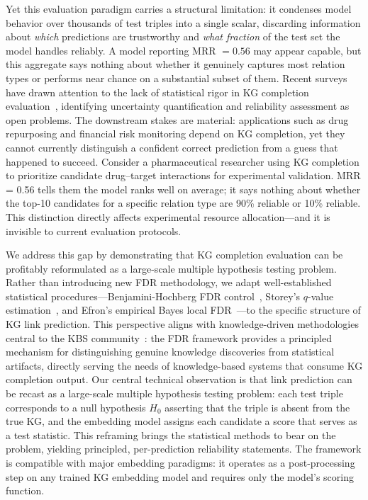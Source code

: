 Yet this evaluation paradigm carries a structural limitation: it condenses model behavior over thousands of test triples into a single scalar, discarding information about \emph{which} predictions are trustworthy and \emph{what fraction} of the test set the model handles reliably.
A model reporting MRR $= 0.56$ may appear capable, but this aggregate says nothing about whether it genuinely captures most relation types or performs near chance on a substantial subset of them.
Recent surveys have drawn attention to the lack of statistical rigor in KG completion evaluation~\cite{jarnac2025uncertainty,biswas2023knowledge}, identifying uncertainty quantification and reliability assessment as open problems.
The downstream stakes are material: applications such as drug repurposing and financial risk monitoring depend on KG completion, yet they cannot currently distinguish a confident correct prediction from a guess that happened to succeed.
Consider a pharmaceutical researcher using KG completion to prioritize candidate drug--target interactions for experimental validation. MRR = 0.56 tells them the model ranks well on average; it says nothing about whether the top-10 candidates for a specific relation type are 90\% reliable or 10\% reliable. This distinction directly affects experimental resource allocation---and it is invisible to current evaluation protocols.

We address this gap by demonstrating that KG completion evaluation can be profitably reformulated as a large-scale multiple hypothesis testing problem. Rather than introducing new FDR methodology, we adapt well-established statistical procedures---Benjamini-Hochberg FDR control~\cite{benjamini1995controlling}, Storey's $q$-value estimation~\cite{storey2002direct}, and Efron's empirical Bayes local FDR~\cite{efron2004large}---to the specific structure of KG link prediction.
This perspective aligns with knowledge-driven methodologies central to the KBS community~\cite{shen2022comprehensive,sun2022hake,le2023knowledge,zhang2023conflict,shang2024learnable,lu2024deep,purohit2025vanilla,fang2025knowledge}: the FDR framework provides a principled mechanism for distinguishing genuine knowledge discoveries from statistical artifacts, directly serving the needs of knowledge-based systems that consume KG completion output.
Our central technical observation is that link prediction can be recast as a large-scale multiple hypothesis testing problem: each test triple corresponds to a null hypothesis $H_0$ asserting that the triple is absent from the true KG, and the embedding model assigns each candidate a score that serves as a test statistic.
This reframing brings the statistical methods to bear on the problem, yielding principled, per-prediction reliability statements.
The framework is compatible with major embedding paradigms: it operates as a post-processing step on any trained KG embedding model and requires only the model's scoring function.

